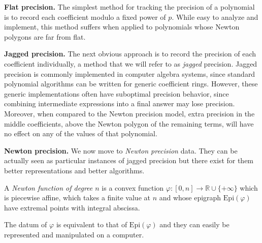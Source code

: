 \documentclass{sig-alternate-2013}
\newcommand{\R}{\mathbb R}
\newcommand{\Epi}{\textrm{Epi}}
\begin{document}
\medskip

\noindent
{\bf Flat precision.}
The simplest method for tracking the precision of a polynomial is
to record each coefficient modulo a fixed power of $p$.  While
easy to analyze and implement, this method suffers when
applied to polynomials whose Newton polygons are far from flat.

\medskip

\noindent
{\bf Jagged precision.}
The next obvious approach is to record the precision of each
coefficient individually, a method that we will refer to as \emph{jagged}
precision.  Jagged precision is commonly implemented
in computer algebra systems, since standard polynomial algorithms
can be written for generic coefficient rings.  However, these
generic implementations often have suboptimal precision behavior,
since combining intermediate expressions into a final answer
may lose precision.  Moreover, when compared to the Newton
precision model, extra precision in the middle coefficients, above
the Newton polygon of the remaining terms, will have no effect
on any of the values of that polynomial.

\medskip

\noindent
{\bf Newton precision.} 
We now move to \emph{Newton precision} data. They can be actually seen 
as particular instances of jagged precision but there exist for them 
better representations and better algorithms.

\begin{deftn}
A \emph{Newton function of degree $n$} is a convex function 
$\varphi : [0,n] \to \R \cup \{+\infty\}$ which is piecewise affine, 
which takes a finite value at $n$ and whose epigraph $\Epi(\varphi)$ 
have extremal points with integral abscissa.
\end{deftn}

\begin{rem}
The datum of $\varphi$ is equivalent to that of $\Epi(\varphi)$ and they 
can easily be represented and manipulated on a computer.
\end{rem}
\end{document}
